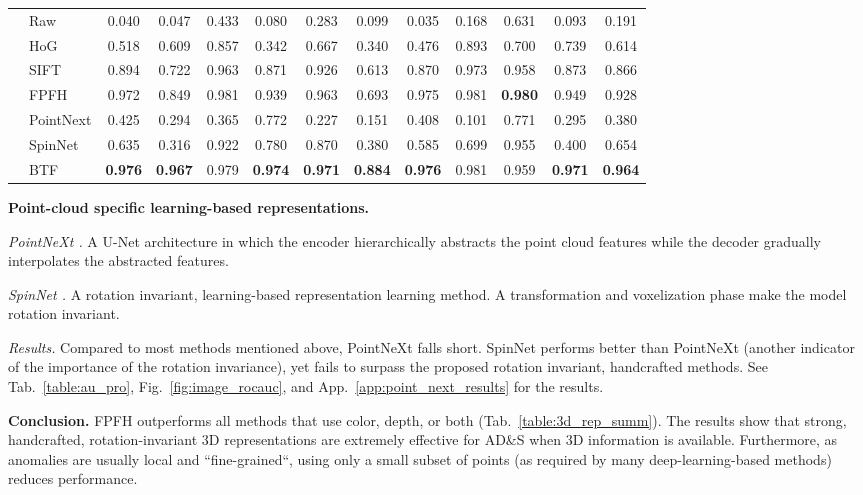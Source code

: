 \documentclass{article}
\begin{document}
\begin{table*}[t]
\begin{center}
{\begin{tabular}{@{\hskip5pt}l@{\hskip5pt}l|cccccccccc|c}
    & Raw & 0.040 & 0.047 & 0.433 & 0.080 & 0.283 & 0.099 & 0.035 & 0.168 & 0.631 & 0.093 & 0.191 \\
    & HoG & 0.518 & 0.609 & 0.857 & 0.342 & 0.667 & 0.340 & 0.476 & 0.893 & 0.700 & 0.739 & 0.614 \\
    & SIFT & 0.894 & 0.722 & 0.963 & 0.871 & 0.926 & 0.613 & 0.870 & 0.973 & 0.958 & 0.873 & 0.866 \\
    & FPFH & 0.972 & 0.849 & 0.981 & 0.939 & 0.963 & 0.693 & 0.975 & 0.981 & \textbf{0.980} & 0.949 & 0.928 \\
    & PointNext  & 0.425 & 0.294 & 0.365 & 0.772 & 0.227 & 0.151 & 0.408 & 0.101 & 0.771 & 0.295 & 0.380 \\
    & SpinNet & 0.635 & 0.316 & 0.922 & 0.780 & 0.870 & 0.380 & 0.585 & 0.699 & 0.955 & 0.400 & 0.654 \\
    & BTF & \textbf{0.976} & \textbf{0.967} & 0.979 & \textbf{0.974} & \textbf{0.971} & \textbf{0.884} & \textbf{0.976} & 0.981 & 0.959 & \textbf{0.971} & \textbf{0.964} \\
   \bottomrule
    \end{tabular}
}
\end{center}
\end{table*}


\noindent \textbf{Point-cloud specific learning-based representations.}

\noindent \textit{PointNeXt \cite{point_next}.} A U-Net \cite{unet} architecture in which the encoder hierarchically abstracts the point cloud features while the decoder gradually interpolates the abstracted features. 

\noindent \textit{SpinNet \cite{spinnet}.}  A rotation invariant, learning-based representation learning method. A transformation and voxelization phase make the model rotation invariant.

\noindent \textit{Results.}
Compared to most methods mentioned above, PointNeXt falls short. SpinNet performs better than PointNeXt (another indicator of the importance of the rotation invariance), yet fails to surpass the proposed rotation invariant, handcrafted methods. See Tab.~\ref{table:au_pro}, Fig.~\ref{fig:image_rocauc}, and App.~\ref{app:point_next_results} for the results.

\noindent \textbf{Conclusion.} FPFH outperforms all methods that use color, depth, or both (Tab.~\ref{table:3d_rep_summ}). The results show that strong, handcrafted, rotation-invariant 3D representations are extremely effective for AD\&S when 3D information is available. Furthermore, as anomalies are usually local and ``fine-grained``, using only a small subset of points (as required by many deep-learning-based methods) reduces performance. 
\end{document}
